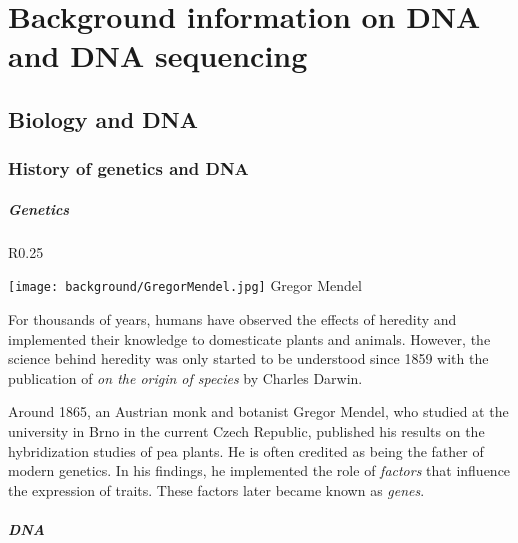
\chapter{Background information on DNA and DNA sequencing}

\section{Biology and DNA}

\subsection{History of genetics and DNA}

\paragraph{Genetics}

\begin{wrapfigure}{R}{0.25\textwidth}
	\begin{center}
		\texttt{[image: background/GregorMendel.jpg]}
		Gregor Mendel
	\end{center}
\end{wrapfigure}


For thousands of years, humans have observed the effects of heredity and implemented their knowledge to domesticate plants and animals. However, the science behind heredity was only started to be understood since 1859 with the publication of \emph{on the origin of species} by Charles Darwin. 

Around 1865, an Austrian monk and botanist Gregor Mendel, who studied at the university in Brno in the current Czech Republic, published his results on the hybridization studies of pea plants. He is often credited as being the father of modern genetics. In his findings, he implemented the role of \emph{factors} that influence the expression of traits. These factors later became known as \emph{genes}.

\paragraph{DNA}

